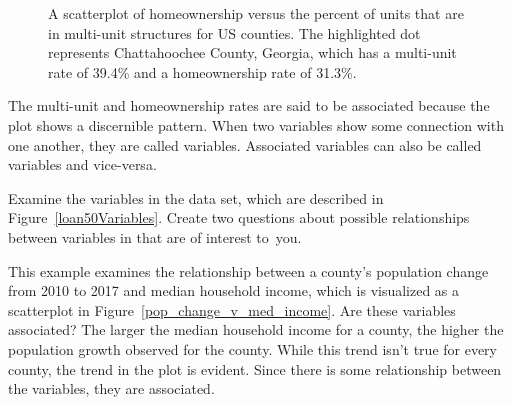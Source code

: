 \begin{figure}[h]
  \centering
  \caption{A scatterplot of homeownership versus the percent
      of units that are in multi-unit structures for US counties.
      The highlighted dot represents Chattahoochee County, Georgia,
      which has a multi-unit rate of 39.4\% and a homeownership rate
      of 31.3\%.}
  \label{multiunitsVsOwnership}
\end{figure}

The multi-unit and homeownership rates are said to be
associated because the plot shows a discernible pattern.
When two variables show some connection with one another,
they are called  variables.
Associated variables can also be called 
variables and vice-versa.

\D{\newpage}

\begin{exercisewrap}
\begin{nexercise}
Examine the variables in the  data set,
which are described in Figure~\vref{loan50Variables}.
Create two questions about possible relationships
between variables in  that are of interest
to~you.\footnotemark
\end{nexercise}
\end{exercisewrap}

\begin{examplewrap}
\begin{nexample}{This example examines the relationship
    between a county's population change
    from 2010 to 2017
    and median household income,
    which is visualized as a scatterplot in
    Figure~\ref{pop_change_v_med_income}.
    Are these variables associated?}
  The larger the median household income for a county,
  the higher the population growth observed for the county.
  While this trend isn't true for every county,
  the trend in the plot is evident.
  Since there is some relationship between the variables,
  they are associated.
\end{nexample}
\end{examplewrap}


